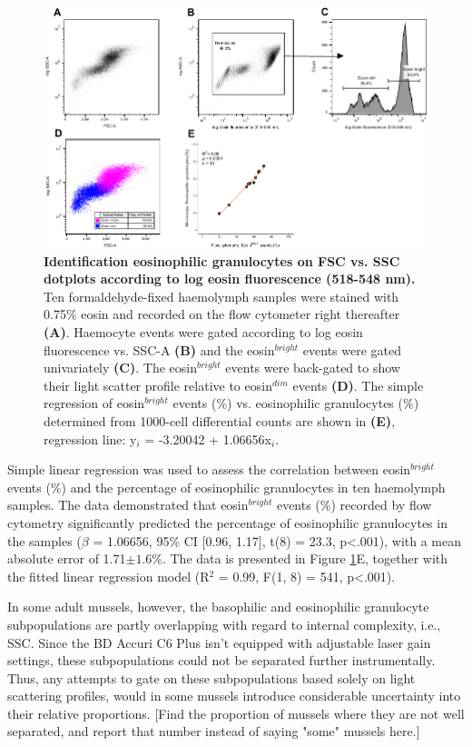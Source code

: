 \begin{figure}[!ht]
    \centering
    \includegraphics[width=1.0\textwidth]{figures/Method development/Eosin with method validation.pdf}
    \caption{\textbf{Identification eosinophilic granulocytes on FSC vs. SSC dotplots according to log eosin fluorescence (518-548 nm).} Ten formaldehyde-fixed haemolymph samples were stained with 0.75\% eosin and recorded on the flow cytometer right thereafter \textbf{(A)}. Haemocyte events were gated according to log eosin fluorescence vs. SSC-A \textbf{(B)} and the eosin$^{bright}$ events were gated univariately \textbf{(C)}. The eosin$^{bright}$ events were back-gated to show their light scatter profile relative to eosin$^{dim}$ events \textbf{(D)}. The simple regression of eosin$^{bright}$ events (\%) vs. eosinophilic granulocytes (\%) determined from 1000-cell differential counts are shown in \textbf{(E)}, regression line: y$_{i}$ = -3.20042 + 1.06656x$_{i}$.}
    \label{fig:eosin_exp2}
\end{figure}

Simple linear regression was used to assess the correlation between eosin$^{bright}$ events (\%) and the percentage of eosinophilic granulocytes in ten haemolymph samples. The data demonstrated that eosin$^{bright}$ events (\%) recorded by flow cytometry significantly predicted the percentage of eosinophilic granulocytes in the samples ($\beta$ = 1.06656, 95\% CI [0.96, 1.17], t(8) = 23.3, p<.001), with a mean absolute error of 1.71$\pm{1.6}$\%. The data is presented in Figure \ref{fig:eosin_exp2}E, together with the fitted linear regression model (R$^{2}$ = 0.99, F(1, 8) = 541, p<.001). \newpage



In some adult mussels, however, the basophilic and eosinophilic granulocyte subpopulations are partly overlapping with regard to internal complexity, i.e., SSC. Since the BD Accuri C6 Plus isn't equipped with adjustable laser gain settings, these subpopulations could not be separated further instrumentally. Thus, any attempts to gate on these subpopulations based solely on light scattering profiles, would in some mussels introduce considerable uncertainty into their relative proportions. [Find the proportion of mussels where they are not well separated, and report that number instead of saying "some" mussels here.]

